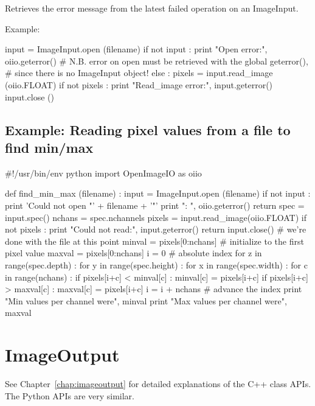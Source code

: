 Retrieves the error message from the latest failed operation on an
ImageInput.

\noindent Example:
\begin{code}
    input = ImageInput.open (filename)
    if not input :
        print "Open error:", oiio.geterror()
        # N.B. error on open must be retrieved with the global geterror(),
        # since there is no ImageInput object!
    else :
        pixels = input.read_image (oiio.FLOAT)
        if not pixels :
            print "Read_image error:", input.geterror()
        input.close ()
\end{code}
\apiend

\newpage
\subsection*{Example: Reading pixel values from a file to find min/max}

\begin{code}
#!/usr/bin/env python 
import OpenImageIO as oiio

def find_min_max (filename) :
    input = ImageInput.open (filename)
    if not input :
        print 'Could not open "' + filename + '"'
        print "\tError: ", oiio.geterror()
        return
    spec = input.spec()
    nchans = spec.nchannels
    pixels = input.read_image(oiio.FLOAT)
    if not pixels :
        print "Could not read:", input.geterror()
        return
    input.close()    # we're done with the file at this point
    minval = pixels[0:nchans]   # initialize to the first pixel value
    maxval = pixels[0:nchans]
    i = 0    # absolute index
    for z in range(spec.depth) :
        for y in range(spec.height) :
            for x in range(spec.width) :
                for c in range(nchans) :
                    if pixels[i+c] < minval[c] :
                        minval[c] = pixels[i+c]
                    if pixels[i+c] > maxval[c] :
                        maxval[c] = pixels[i+c]
                i = i + nchans   # advance the index
    print "Min values per channel were", minval
    print "Max values per channel were", maxval
\end{code}
\newpage


\section{ImageOutput}
\label{sec:pythonimageoutput}

See Chapter~\ref{chap:imageoutput} for detailed explanations of the
C++ \ImageOutput class APIs. The Python APIs are very similar.

